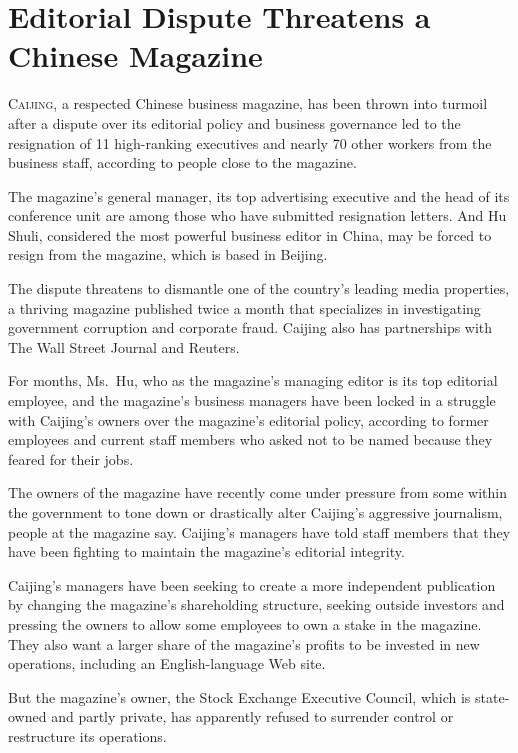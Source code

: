 ﻿\documentclass[12pt]{article}
\begin{document}
\section{Editorial Dispute Threatens a Chinese Magazine}

\lettrine{C}{aijing}, a respected Chinese business magazine, has been thrown
into turmoil\cite{turmoil} after a dispute over its editorial policy and business governance led to
the resignation of 11 high-ranking executives and nearly 70 other workers from the business staff,
according to people close to the magazine.

The magazine's general manager, its top advertising executive and the head of its conference unit
are among those who have submitted resignation letters. And Hu Shuli, considered the most powerful
business editor in China, may be forced to resign from the magazine, which is based in Beijing.

The dispute threatens to dismantle one of the country's leading media properties, a thriving
magazine published twice a month that specializes in investigating government corruption and
corporate fraud. Caijing also has partnerships with The Wall Street Journal and Reuters.

For months, Ms.~Hu, who as the magazine's managing editor is its top editorial employee, and the
magazine's business managers have been locked in a struggle with Caijing's owners over the
magazine's editorial policy, according to former employees and current staff members who asked not
to be named because they feared for their jobs.

The owners of the magazine have recently come under pressure from some within the government to tone
down or drastically alter Caijing's aggressive journalism, people at the magazine say. Caijing's
managers have told staff members that they have been fighting to maintain the magazine's editorial
integrity.

Caijing's managers have been seeking to create a more independent publication by changing the
magazine's shareholding structure, seeking outside investors and pressing the owners to allow some
employees to own a stake in the magazine. They also want a larger share of the magazine's profits to
be invested in new operations, including an English-language Web site.

But the magazine's owner, the Stock Exchange Executive Council, which is state-owned and partly
private, has apparently refused to surrender control or restructure its operations.
\end{document}

